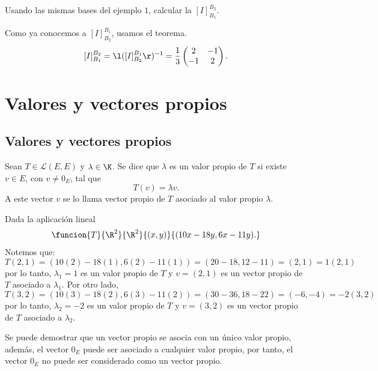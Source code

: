 \documentclass[compacto,10pt]{pubciencias-notas}
\begin{document}
\begin{ejem}
Usando las mismas bases del ejemplo $1$, calcular la $[I]^{B_{2}}_{B_{1}}$.

\noindent Como ya conocemos a $[I]^{B_{1}}_{B_{2}}$, usamos el teorema.
\[
    [I]^{B_{2}}_{B_{1}} = \l([I]^{B_{1}}_{B_{2}}\r)^{-1} = 
    \frac{1}{3}\begin{pmatrix}2&-1\\-1&2\end{pmatrix}.
\]
\end{ejem}


\setcounter{section}{6}
\section{Valores y vectores propios}


\subsection{Valores y vectores propios}
\begin{defi}
Sean $T \in \mathscr{L}(E,E)$ y $\lambda \in\K$. Se dice que $\lambda$ es un valor propio de $T$ si existe $v\in E$, con $v\neq 0_{E}$, tal que
\[
    T(v) = \lambda v.
\]
A este vector $v$ se lo llama vector propio de $T$ asociado al valor propio $\lambda$.
\end{defi}



\begin{ejem}\hspace{0pt} Dada la aplicación lineal
\[
    \funcion{T}{\R^2}{\R^2}{(x,y)}{(10x-18y,6x-11y).}
\]
Notemos que:
\[
T(2,1) = (10(2) -18(1), 6(2) -11(1)) = (20-18,12-11)=(2,1) = 1 (2,1)
\]
por lo tanto, $\lambda_{1}=1$ es un valor propio de $T$ y $v=(2,1)$ es un vector propio de $T$ asociado a $\lambda_{1}$.
Por otro lado,
\[
T(3,2) = (10(3) -18(2), 6(3) -11(2)) = (30-36,18-22)=(-6,-4) = -2 (3,2)
\]
por lo tanto, $\lambda_{2}=-2$ es un valor propio de $T$ y $v=(3,2)$ es un vector propio de $T$ asociado a $\lambda_{2}$.

\end{ejem}


\begin{advertencia}
Se puede demostrar que un vector propio se asocia con un único valor propio, además, el vector $0_{E}$ puede ser asociado a cualquier valor propio, por tanto, el vector $0_{E}$ no puede ser considerado como un vector propio.
\end{advertencia}
\end{document}
